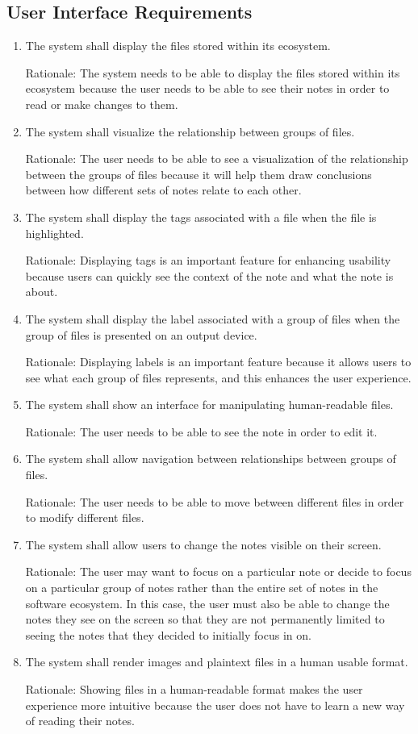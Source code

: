 \documentclass{article}
\begin{document}
\subsection{User Interface Requirements}
\begin{enumerate}[U{I}R1]
\item The system shall display the files stored within its ecosystem.

Rationale: The system needs to be able to display the files stored within its ecosystem because the user needs to be able to see their notes in order to read or make changes to them.
\item The system shall visualize the relationship between groups of files.

Rationale: The user needs to be able to see a visualization of the relationship between the groups of files because it will help them draw conclusions between how different sets of notes relate to each other.
\item The system shall display the tags associated with a file when the file is highlighted.

Rationale: Displaying tags is an important feature for enhancing usability because users can quickly see the context of the note and what the note is about.
\item The system shall display the label associated with a group of files when the group of files is presented on an output device.

Rationale: Displaying labels is an important feature because it allows users to see what each group of files represents, and this enhances the user experience.
\item The system shall show an interface for manipulating human-readable files.

Rationale: The user needs to be able to see the note in order to edit it.
\item The system shall allow navigation between relationships between groups of files.

Rationale: The user needs to be able to move between different files in order to modify different files.
\item The system shall allow users to change the notes visible on their screen.

Rationale: The user may want to focus on a particular note or decide to focus on a particular group of notes rather than the entire set of notes in the software ecosystem. In this case, the user must also be able to change the notes they see on the screen so that they are not permanently limited to seeing the notes that they decided to initially focus in on.
\item The system shall render images and plaintext files in a human usable format.

Rationale: Showing files in a human-readable format makes the user experience more intuitive because the user does not have to learn a new way of reading their notes.
\end{enumerate}
\end{document}
